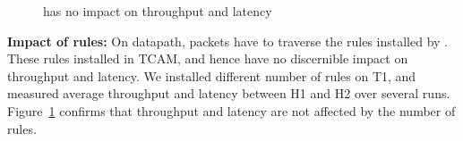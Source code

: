 

\begin{figure}[t]
	\centering
	
	\vspace{-1em}
	\caption{\sysname{} has no impact on throughput and latency}
	\vspace{-1em}
	\label{fig:perf_penalty}
\end{figure}

\textbf{Impact of \sysname{} rules:} On datapath, packets have to traverse the rules installed by \sysname{}.  These
rules installed in TCAM, and hence have no discernible impact on throughput and
latency. We installed different number of \sysname{} rules on T1, and measured
average throughput and latency between H1 and H2 over several runs.
Figure~\ref{fig:perf_penalty} confirms that throughput and latency are not
affected by the number of rules.




%	


